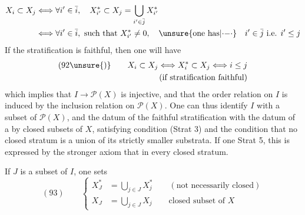 
\[
\begin{aligned}
X_i\subset X_j&\Longleftrightarrow\forall i'\in\bar i,\quad X_{i'}^*\subset X_j=\bigcup_{i'\in\bar j}X_{i'}^*\\
&\Longleftrightarrow\forall i'\in\bar i,\text{ such that }X_{i'}^*\neq0,\quad\unsure{\text{one has}|\mathord{\cdot}\mathord{-}\mathord{\cdot}}\quad i'\in\bar j\text{ i.e. }i'\leq j
\end{aligned}
\]
If the stratification is faithful, then one will  have
\[
\begin{aligned}
(92\unsure{)}\qquad X_i\subset X_j\Longleftrightarrow X_i^*\subset X_j\Longleftrightarrow i\leq j&\\
(\text{if stratification faithful})&
\end{aligned}
\]
which implies that $I\longrightarrow\mathcal P(X)$ is injective, and that the order relation on $I$ is induced by the inclusion relation on $\mathcal P(X)$. One can thus identify $I$ with a subset of $\mathcal P(X)$, and the datum of the faithful stratification with the datum of a   by  closed subsets of $X$,  satisfying condition (Strat 3)  and the condition that no closed stratum is a union of its strictly smaller substrata. If one  Strat 5, this is expressed by the stronger axiom that in every closed stratum.

If $J$ is a subset of $I$, one sets
\[
(93)\qquad\left\{
\begin{aligned}
X_J^*&=\bigcup_{j\in J}X_j^*\qquad(\text{not necessarily closed})\\
X_J&=\bigcup_{j\in J}X_j\qquad\text{closed subset of }X
\end{aligned}\right.
\]
